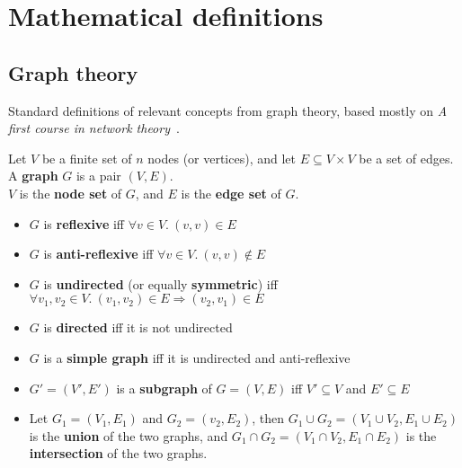 \chapter{Mathematical definitions}\label{ch:math_definitions}

\section{Graph theory}

Standard definitions of relevant concepts from graph theory, based mostly on \textsl{A first course in network theory}~\cite{Estrada2017}.

\begin{definition}[Graph]
    Let $V$ be a finite set of $n$ nodes (or vertices), and let $E \subseteq V \times V$ be a set of edges.\\
    A \textbf{graph} $G$ is a pair $(V, E)$.\\
    $V$ is the \textbf{node set} of $G$, and $E$ is the \textbf{edge set} of $G$.
\end{definition}

\begin{definition}
    \begin{itemize}[leftmargin=*]
        \item $G$ is \textbf{reflexive} iff $\forall v \in V.\ (v, v) \in E$
        \item $G$ is \textbf{anti-reflexive} iff $\forall v \in V.\ (v, v) \notin E$
        \item $G$ is \textbf{undirected} (or equally \textbf{symmetric}) iff $\forall v_1, v_2 \in V.\ (v_1, v_2) \in E \Rightarrow (v_2, v_1) \in E$
        \item $G$ is \textbf{directed} iff it is not undirected
        \item $G$ is a \textbf{simple graph} iff it is undirected and anti-reflexive
    \end{itemize}
\end{definition}

\begin{definition}
    \begin{itemize}[leftmargin=*]
        \item $G' = (V', E')$ is a \textbf{subgraph} of $G = (V, E)$ iff $V' \subseteq V$ and $E' \subseteq E$
        \item Let $G_1 = (V_1, E_1)$ and $G_2 = (v_2, E_2)$, then $G_1 \cup G_2 = (V_1 \cup V_2, E_1 \cup E_2)$ is the \textbf{union} of the two graphs, and $G_1 \cap G_2 = (V_1 {\cap} V_2, E_1 {\cap} E_2)$ is the \textbf{intersection} of the two graphs.
    \end{itemize}
\end{definition}

